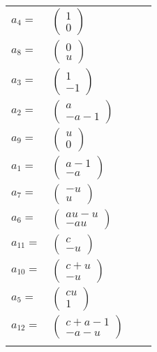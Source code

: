 \documentclass[1p]{elsarticle_modified}
\theoremstyle{definition}
\begin{document}
\begin{tabular}{m{7pt} m{180pt} m{7pt} m{180pt} }
\flushright $a_{4}=$&$\begin{pmatrix}1\\0\end{pmatrix}$ \\
\flushright $a_{8}=$&$\begin{pmatrix}0\\u\end{pmatrix}$ \\
\flushright $a_{3}=$&$\begin{pmatrix}1\\-1\end{pmatrix}$ \\
\flushright $a_{2}=$&$\begin{pmatrix}a\\- a-1\end{pmatrix}$ \\
\flushright $a_{9}=$&$\begin{pmatrix}u\\0\end{pmatrix}$ \\
\flushright $a_{1}=$&$\begin{pmatrix}a-1\\- a\end{pmatrix}$ \\
\flushright $a_{7}=$&$\begin{pmatrix}- u\\u\end{pmatrix}$ \\
\flushright $a_{6}=$&$\begin{pmatrix}a u- u\\- a u\end{pmatrix}$ \\
\flushright $a_{11}=$&$\begin{pmatrix}c\\- u\end{pmatrix}$ \\
\flushright $a_{10}=$&$\begin{pmatrix}c+u\\- u\end{pmatrix}$ \\
\flushright $a_{5}=$&$\begin{pmatrix}c u\\1\end{pmatrix}$ \\
\flushright $a_{12}=$&$\begin{pmatrix}c+a-1\\- a- u\end{pmatrix}$\\&\end{tabular}
\end{document}
